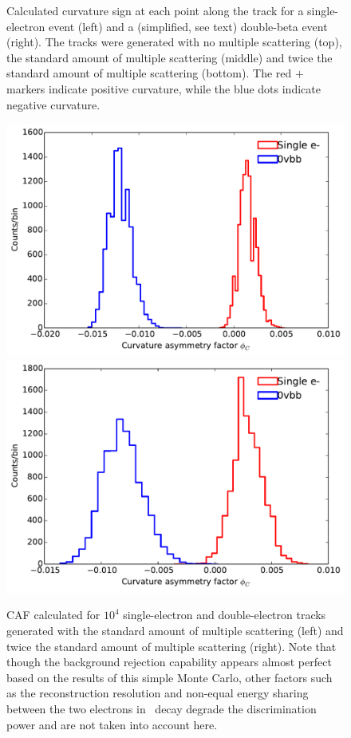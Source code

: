 \documentclass{JINST}
\begin{document}
\begin{figure}[!htb]
	\caption{\label{fig_trkcurv_cf}Calculated curvature sign at each point along the track for a single-electron event (left) and a (simplified, see text) double-beta event (right).  The tracks were generated with no multiple scattering (top), the 
	standard amount of multiple scattering (middle) and twice the standard amount of multiple scattering 
	(bottom).  The red $+$ markers indicate positive curvature, while the blue dots indicate negative curvature.}
\end{figure}

\begin{figure}[!htb]
	\includegraphics[scale=0.45]{fig/scurv_diff_means_ms13pt6.pdf}
	\includegraphics[scale=0.45]{fig/scurv_diff_means_ms27pt2.pdf}
	\caption{\label{fig_assym_cf} CAF calculated for $10^4$ single-electron and double-electron tracks generated with the standard amount of multiple scattering (left) and twice the standard amount of multiple scattering (right).  Note that though the background rejection capability appears almost perfect based on the results of this simple Monte Carlo, other factors such as the reconstruction resolution and non-equal energy sharing between the two electrons in \bbonu\ decay degrade the discrimination power and are not taken into account here.}
\end{figure}
\end{document}
